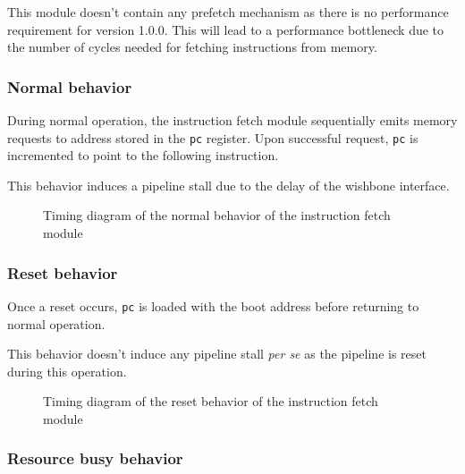     \begin{content}
        This module doesn't contain any prefetch mechanism as there is no performance requirement for version 1.0.0. This will lead to a performance bottleneck due to the number of cycles needed for fetching instructions from memory.
      \end{content}

    \subsubsection{Normal behavior}

      \begin{content}
          During normal operation, the instruction fetch module sequentially emits memory requests to address stored in the \texttt{pc} register. Upon successful request, \texttt{pc} is incremented to point to the following instruction.

          This behavior induces a pipeline stall due to the delay of the wishbone interface.
        \end{content}

      \begin{figure}[H]
          \centering
          
          \caption{Timing diagram of the normal behavior of the instruction fetch module}
          \label{fig:ifm-behavior-normal}
        \end{figure}

    \subsubsection{Reset behavior}

      \begin{content}
          Once a reset occurs, \texttt{pc} is loaded with the boot address before returning to normal operation.

          This behavior doesn't induce any pipeline stall \textit{per se} as the pipeline is reset during this operation.
        \end{content}

      \begin{figure}[H]
          \centering
          
          \caption{Timing diagram of the reset behavior of the instruction fetch module}
          \label{fig:ifm-behavior-reset}
        \end{figure}

    \subsubsection{Resource busy behavior}


